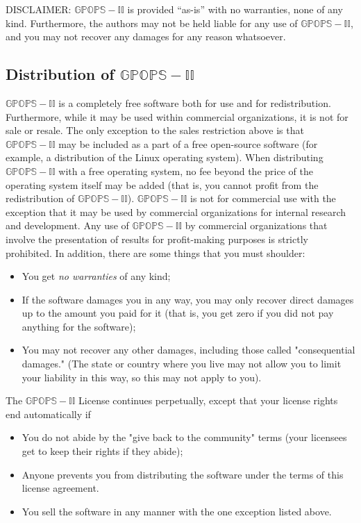 \documentclass[10pt]{article}
\begin{document}
DISCLAIMER:  $\mathbb{GPOPS-II}$ is provided “as-is” with no
warranties, none of any kind.  Furthermore, the authors may not be
held liable for any use of $\mathbb{GPOPS-II}$, and you may not
recover any damages for any reason whatsoever. 

\subsection*{Distribution of $\mathbb{GPOPS-II}$}

$\mathbb{GPOPS-II}$ is a completely free software both for use and for
redistribution.  Furthermore, while it may be used within commercial
organizations, it is not for sale or resale.  The only exception to
the sales restriction above is that $\mathbb{GPOPS-II}$ may be included as a part of
a free open-source software (for example, a distribution of the Linux
operating system).  When distributing $\mathbb{GPOPS-II}$ with a free
operating system, no fee beyond the price of the operating system
itself may be added (that is, you cannot profit from the
redistribution of $\mathbb{GPOPS-II}$). $\mathbb{GPOPS-II}$ is not for commercial use with
the exception that it may be used by commercial organizations for
internal research and development.  Any use of $\mathbb{GPOPS-II}$ by commercial
organizations that involve the presentation of results for
profit-making purposes is strictly prohibited.  In addition, there are
some things that you must shoulder:
\begin{itemize}
\item You get {\em no warranties} of any kind;
\item If the software damages you in any way, you may only recover
direct damages up to the amount you paid for it (that is, you get zero
if you did not pay anything for the software);
\item You may not recover any other damages, including those called
"consequential damages." (The state or country where you live may not
allow you to limit your liability in this way, so this may not apply
to you).
\end{itemize}
The $\mathbb{GPOPS-II}$ License continues perpetually, except that your license
rights end automatically if
\begin{itemize}
\item You do not abide by the "give back to the community" terms (your
licensees get to keep their rights if they abide);
\item Anyone prevents you from distributing the software under the
terms of this license agreement.
\item You sell the software in any manner with the one exception
listed above.
\end{itemize}
\end{document}
